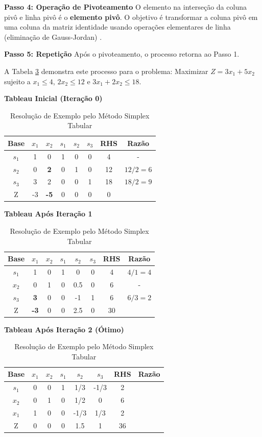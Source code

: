 \documentclass[conference]{IEEEtran}
\begin{document}
\textbf{Passo 4: Operação de Pivoteamento}
O elemento na interseção da coluna pivô e linha pivô é o \textbf{elemento pivô}. O objetivo é transformar a coluna pivô em uma coluna da matriz identidade usando operações elementares de linha (eliminação de Gauss-Jordan) \cite{menezes}.

\textbf{Passo 5: Repetição}
Após o pivoteamento, o processo retorna ao Passo 1.

A Tabela \ref{tab:simplex_iter} demonstra este processo para o problema: Maximizar $Z = 3x_1 + 5x_2$ sujeito a $x_1 \le 4$, $2x_2 \le 12$ e $3x_1 + 2x_2 \le 18$.

\begin{table}[h]
\caption{Resolução de Exemplo pelo Método Simplex Tabular}
\label{tab:simplex_iter}
\centering
\fontsize{8}{10}\selectfont
\setlength{\tabcolsep}{4pt} %

\textbf{Tableau Inicial (Iteração 0)}
\begin{tabular}{cccccccc}
\toprule
Base & $x_1$ & $x_2$ & $s_1$ & $s_2$ & $s_3$ & RHS & Razão \\
\midrule
$s_1$ & 1 & 0 & 1 & 0 & 0 & 4 & - \\
$s_2$ & 0 & \textbf{2} & 0 & 1 & 0 & 12 & $12/2 = 6$ \\
$s_3$ & 3 & 2 & 0 & 0 & 1 & 18 & $18/2 = 9$ \\
\midrule
Z & -3 & \textbf{-5} & 0 & 0 & 0 & 0 & \\
\bottomrule
\end{tabular}

\vspace{0.3cm}
\textbf{Tableau Após Iteração 1}
\begin{tabular}{cccccccc}
\toprule
Base & $x_1$ & $x_2$ & $s_1$ & $s_2$ & $s_3$ & RHS & Razão \\
\midrule
$s_1$ & 1 & 0 & 1 & 0 & 0 & 4 & $4/1 = 4$ \\
$x_2$ & 0 & 1 & 0 & 0.5 & 0 & 6 & - \\
$s_3$ & \textbf{3} & 0 & 0 & -1 & 1 & 6 & $6/3 = 2$ \\
\midrule
Z & \textbf{-3} & 0 & 0 & 2.5 & 0 & 30 & \\
\bottomrule
\end{tabular}

\vspace{0.3cm}
\textbf{Tableau Após Iteração 2 (Ótimo)}
\begin{tabular}{cccccccc}
\toprule
Base & $x_1$ & $x_2$ & $s_1$ & $s_2$ & $s_3$ & RHS & Razão \\
\midrule
$s_1$ & 0 & 0 & 1 & 1/3 & -1/3 & 2 & \\
$x_2$ & 0 & 1 & 0 & 1/2 & 0 & 6 & \\
$x_1$ & 1 & 0 & 0 & -1/3 & 1/3 & 2 & \\
\midrule
Z & 0 & 0 & 0 & 1.5 & 1 & 36 & \\
\bottomrule
\end{tabular}
\end{table}
\end{document}

